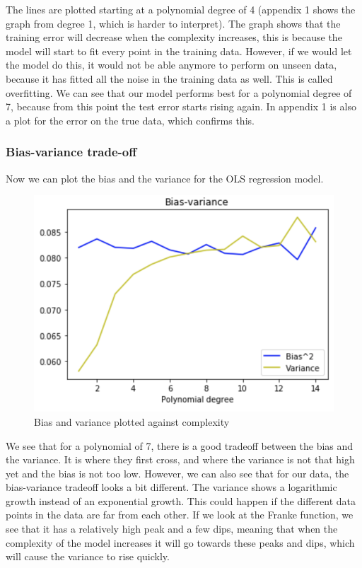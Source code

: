 \documentclass[12pt]{extarticle}
\begin{document}
The lines are plotted starting at a polynomial degree of 4 (appendix 1 shows the graph from degree 1, which is harder to interpret). The graph shows that the training error will decrease when the complexity increases, this is because the model will start to fit every point in the training data. However, if we would let the model do this, it would not be able anymore to perform on unseen data, because it has fitted all the noise in the training data as well. This is called overfitting. We can see that our model performs best for a polynomial degree of 7, because from this point the test error starts rising again. In appendix 1 is also a plot for the error on the true data, which confirms this.

\subsubsection{Bias-variance trade-off}

Now we can plot the bias and the variance for the OLS regression model.

\begin{figure}
    \centering
    \includegraphics{4}
    \caption{Bias and variance plotted against complexity}
    \label{fig:f5}
\end{figure}

We see that for a polynomial of 7, there is a good tradeoff between the bias and the variance. It is where they first cross, and where the variance is not that high yet and the bias is not too low. However, we can also see that for our data, the bias-variance tradeoff looks a bit different. The variance shows a logarithmic growth instead of an exponential growth. This could happen if the different data points in the data are far from each other. If we look at the Franke function, we see that it has a relatively high peak and a few dips, meaning that when the complexity of the model increases it will go towards these peaks and dips, which will cause the variance to rise quickly.
\end{document}

